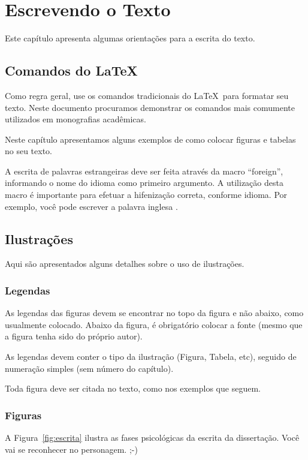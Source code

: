 \section{Escrevendo o Texto}
Este capítulo apresenta algumas orientações para a escrita do texto.

\subsection{Comandos do \LaTeX}
Como regra geral, use os comandos tradicionais do \LaTeX\ para formatar seu texto.  Neste documento procuramos demonstrar os comandos mais comumente utilizados em monografias acadêmicas.

Neste capítulo apresentamos alguns exemplos de como colocar figuras e tabelas no seu texto.

A escrita de palavras estrangeiras deve ser feita através da macro ``foreign'', informando o nome do idioma como primeiro argumento. A utilização desta macro é importante para efetuar a hifenização correta, conforme idioma. Por exemplo, você pode escrever a palavra inglesa .

\subsection{Ilustrações}
Aqui são apresentados alguns detalhes sobre o uso de ilustrações.

\subsubsection{Legendas}
As legendas das figuras devem se encontrar no topo da figura e não abaixo, como usualmente colocado. Abaixo da figura, é obrigatório colocar a fonte (mesmo que a figura tenha sido do próprio autor).

As legendas devem conter o tipo da ilustração (Figura, Tabela, etc), seguido de numeração simples (sem número do capítulo).

Toda figura deve ser citada no texto, como nos exemplos que seguem.

\subsubsection{Figuras}
A Figura~\ref{fig:escrita} ilustra as fases psicológicas da escrita da dissertação. Você vai se reconhecer no personagem. ;-)


